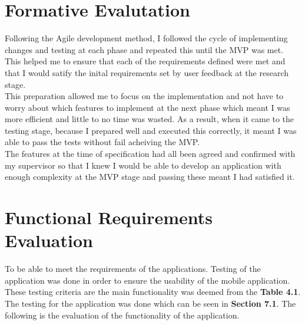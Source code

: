 \documentclass[oneside]{report}
\begin{document}
	\section{Formative Evalutation}
	Following the Agile development method, I followed the cycle of implementing changes and testing at each phase and repeated this until the MVP was met. This helped me to ensure that each of the requirements defined were met and that I would satify the inital requirements set by user feedback at the research stage. \\
	
This preparation allowed me to focus on the implementation and not have to worry about which features to implement at the next phase which meant I was more efficient and little to no time was wasted. As a result, when it came to the testing stage, because I prepared well and executed this correctly, it meant I was able to pass the tests without fail acheiving the MVP.\\

The features at the time of specification had all been agreed and confirmed with my supervisor so that I knew I would be able to develop an application with enough complexity at the MVP stage and passing these meant I had satisfied it.

	\section{Functional Requirements Evaluation}
	To be able to meet the requirements of the applications. Testing of the application was done in order to ensure the usability of the mobile application. These testing criteria are the main functionality was deemed from the \textbf{Table 4.1}. The testing for the application was done which can be seen in \textbf{Section 7.1}. The following is the evaluation of the functionality of the application.\\
\end{document}
